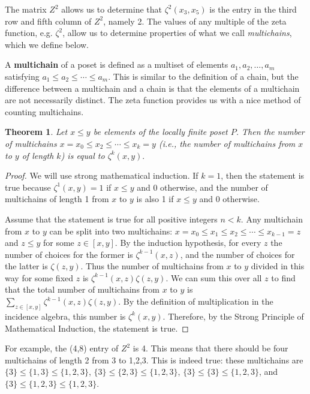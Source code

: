 \documentclass{article} %
\theoremstyle{definition}
\theoremstyle{plain}
\newtheorem{thm}{Theorem}[section]
\begin{document}
The matrix $Z^2$ allows us to determine that $\zeta^2(x_3,x_5)$ is the entry in the third row and fifth column of $Z^2$, namely 2. The values of any multiple of the zeta function, e.g. $\zeta^2$, allow us to determine properties of what we call \textit{multichains}, which we define below.

A \textbf{multichain} of a poset is defined as a multiset of elements $a_1,a_2,\dots,a_m$ satisfying $a_1 \leq a_2 \leq \cdots \leq a_m$. This is similar to the definition of a chain, but the difference between a multichain and a chain is that the elements of a multichain are not necessarily distinct. The zeta function provides us with a nice method of counting multichains.

\begin{thm} %
Let $x \leq y$ be elements of the locally finite poset $P$. Then the number of multichains $x = x_0 \leq x_2 \leq \cdots \leq x_k = y$ (i.e., the number of multichains from $x$ to $y$ of length $k$) is equal to $\zeta^k(x,y).$
\end{thm}

\begin{proof}
We will use strong mathematical induction. If $k=1$, then the statement is true because $\zeta^1(x,y) = 1$ if $x \leq y$ and 0 otherwise, and the number of multichains of length 1 from $x$ to $y$ is also 1 if $x \leq y$ and 0 otherwise.

Assume that the statement is true for all positive integers $n<k$. Any multichain from $x$ to $y$ can be split into two multichains: $x=x_0 \leq x_1 \leq x_2 \leq \cdots \leq x_{k-1} = z$ and $z \leq y$ for some $z \in [x,y]$. By the induction hypothesis, for every $z$ the number of choices for the former is $\zeta^{k-1}(x,z)$, and the number of choices for the latter is $\zeta(z,y)$. Thus the number of multichains from $x$ to $y$ divided in this way for some fixed $z$ is $\zeta^{k-1}(x,z)\zeta(z,y)$. We can sum this over all $z$ to find that the total number of multichains from $x$ to $y$ is $\sum_{z\in [x,y]} \zeta^{k-1}(x,z) \zeta(z,y)$. By the definition of multiplication in the incidence algebra, this number is $\zeta^k(x,y)$. Therefore, by the Strong Principle of Mathematical Induction, the statement is true.
\end{proof}

For example, the (4,8) entry of $Z^2$ is 4. This means that there should be four multichains of length 2 from {3} to {1,2,3}. This is indeed true: these multichains are $\{3\}\leq\{1,3\}\leq\{1,2,3\}$, $\{3\}\leq\{2,3\}\leq\{1,2,3\}$, $\{3\}\leq\{3\}\leq\{1,2,3\}$, and $\{3\}\leq\{1,2,3\}\leq\{1,2,3\}$.
\end{document}
